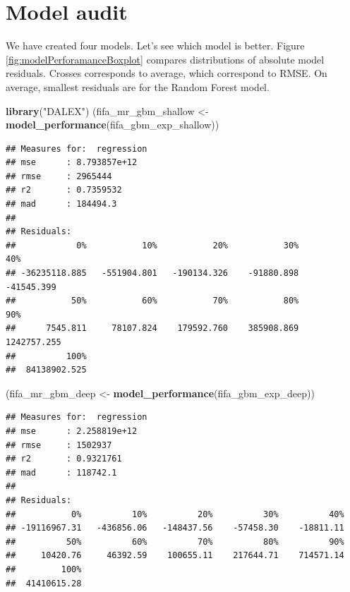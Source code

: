 \documentclass[]{krantz}
\newenvironment{Shaded}{\begin{snugshade}}{\end{snugshade}}
\newcommand{\KeywordTok}[1]{\textcolor[rgb]{0.13,0.29,0.53}{\textbf{#1}}}
\newcommand{\NormalTok}[1]{#1}
\newcommand{\StringTok}[1]{\textcolor[rgb]{0.31,0.60,0.02}{#1}}
\begin{document}
\hypertarget{model-audit}{%
\section{Model audit}\label{model-audit}}

We have created four models. Let's see which model is better. Figure \ref{fig:modelPerforamanceBoxplot} compares distributions of absolute model residuals. Crosses corresponds to average, which correspond to RMSE. On average, smallest residuals are for the Random Forest model.

\begin{Shaded}
\begin{Highlighting}[]
\KeywordTok{library}\NormalTok{(}\StringTok{"DALEX"}\NormalTok{)}
\NormalTok{(fifa_mr_gbm_shallow <-}\StringTok{ }\KeywordTok{model_performance}\NormalTok{(fifa_gbm_exp_shallow))}
\end{Highlighting}
\end{Shaded}

\begin{verbatim}
## Measures for:  regression
## mse      : 8.793857e+12 
## rmse     : 2965444 
## r2       : 0.7359532 
## mad      : 184494.3
## 
## Residuals:
##            0%           10%           20%           30%           40% 
## -36235118.885   -551904.801   -190134.326    -91880.898    -41545.399 
##           50%           60%           70%           80%           90% 
##      7545.811     78107.824    179592.760    385908.869   1242757.255 
##          100% 
##  84138902.525
\end{verbatim}

\begin{Shaded}
\begin{Highlighting}[]
\NormalTok{(fifa_mr_gbm_deep <-}\StringTok{ }\KeywordTok{model_performance}\NormalTok{(fifa_gbm_exp_deep))}
\end{Highlighting}
\end{Shaded}

\begin{verbatim}
## Measures for:  regression
## mse      : 2.258819e+12 
## rmse     : 1502937 
## r2       : 0.9321761 
## mad      : 118742.1
## 
## Residuals:
##           0%          10%          20%          30%          40% 
## -19116967.31   -436856.06   -148437.56    -57458.30    -18811.11 
##          50%          60%          70%          80%          90% 
##     10420.76     46392.59    100655.11    217644.71    714571.14 
##         100% 
##  41410615.28
\end{verbatim}
\end{document}
